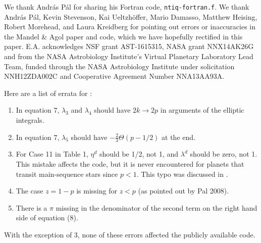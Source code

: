 \documentclass[modern]{aastex61}
\begin{document}
\acknowledgements

We thank Andr\'as P\'al for sharing his Fortran code, \texttt{ntiq-fortran.f}.
We thank Andr\'as P\'al, Kevin Stevenson, Kai Ueltzh\"offer, Mario Damasso,
Matthew Heising, Robert Morehead, and Laura Kreidberg for pointing out
errors or inaccuracies in the Mandel \& Agol paper and code, which we have
hopefully rectified in this paper. 
E.A. acknowledges NSF grant AST-1615315, NASA grant NNX14AK26G and from 
the NASA Astrobiology Institute's Virtual Planetary Laboratory Lead Team, 
funded through the NASA Astrobiology Institute under solicitation NNH12ZDA002C 
and Cooperative Agreement Number NNA13AA93A.



\appendix

Here are a list of errata for \citet{MandelAgol2002}:
\begin{enumerate}
\item In equation 7, $\lambda_3$ and $\lambda_4$ should have $2k \rightarrow
2p$ in arguments of the elliptic integrals.

\item In equation 7, $\lambda_5$ should have $- \frac{2}{3}\Theta(p-1/2)$
at the end.

\item For Case 11 in Table 1, $\eta^d$ should be 1/2, not 1, and
$\lambda^d$ should be zero, not 1.  This mistake affects the code,
but it is never encountered for planets that transit main-sequence
stars since $p<1$.  This typo was discussed in \citet{Eastman2013}.

\item The case $z=1-p$ is missing for $z<p$ (as pointed out by
Pal 2008).

\item There is a $\pi$ missing in the denominator of the second term
on the right hand side of equation (8).
\end{enumerate}

With the exception of 3, none of these errors affected the publicly
available code.
\end{document}
